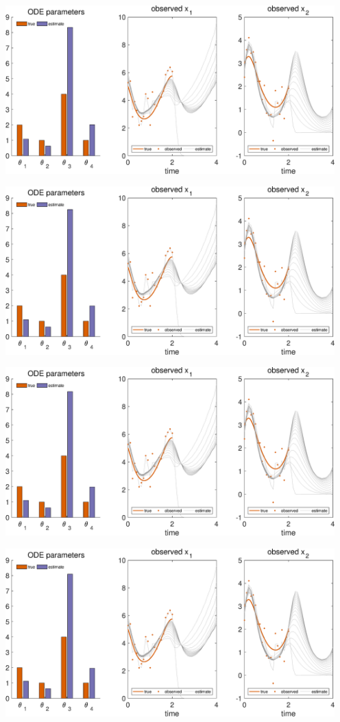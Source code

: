 {\includegraphics [width=5in]{VGM_for_Lotka_Volterra_18.eps}

\includegraphics [width=5in]{VGM_for_Lotka_Volterra_19.eps}

\includegraphics [width=5in]{VGM_for_Lotka_Volterra_20.eps}

\includegraphics [width=5in]{VGM_for_Lotka_Volterra_21.eps}

}
